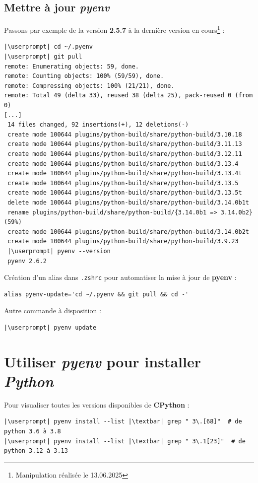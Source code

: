 \subsection*{Mettre à jour \textit{pyenv}}
Passons par exemple de la version \textbf{2.5.7} à la dernière version en cours\footnote{Manipulation réalisée le 13.06.2025} :
\begin{lstlisting}[style=bash]
|\userprompt| cd ~/.pyenv
|\userprompt| git pull
remote: Enumerating objects: 59, done.
remote: Counting objects: 100% (59/59), done.
remote: Compressing objects: 100% (21/21), done.
remote: Total 49 (delta 33), reused 38 (delta 25), pack-reused 0 (from 0)
[...]
 14 files changed, 92 insertions(+), 12 deletions(-)
 create mode 100644 plugins/python-build/share/python-build/3.10.18
 create mode 100644 plugins/python-build/share/python-build/3.11.13
 create mode 100644 plugins/python-build/share/python-build/3.12.11
 create mode 100644 plugins/python-build/share/python-build/3.13.4
 create mode 100644 plugins/python-build/share/python-build/3.13.4t
 create mode 100644 plugins/python-build/share/python-build/3.13.5
 create mode 100644 plugins/python-build/share/python-build/3.13.5t
 delete mode 100644 plugins/python-build/share/python-build/3.14.0b1t
 rename plugins/python-build/share/python-build/{3.14.0b1 => 3.14.0b2} (59%)
 create mode 100644 plugins/python-build/share/python-build/3.14.0b2t
 create mode 100644 plugins/python-build/share/python-build/3.9.23
 |\userprompt| pyenv --version
 pyenv 2.6.2
\end{lstlisting}

Création d'un alias dans \texttt{.zshrc} pour automatiser la mise à jour de \textbf{pyenv} :
\begin{lstlisting}[style=file]
alias pyenv-update='cd ~/.pyenv && git pull && cd -'
\end{lstlisting}

Autre commande à disposition :
\begin{lstlisting}[style=bash]
|\userprompt| pyenv update
\end{lstlisting}

\section{Utiliser \textit{pyenv} pour installer \textit{Python}}
Pour visualiser toutes les versions disponibles de \textbf{CPython} :
\begin{lstlisting}[style=bash]
|\userprompt| pyenv install --list |\textbar| grep " 3\.[68]"  # de python 3.6 à 3.8
|\userprompt| pyenv install --list |\textbar| grep " 3\.1[23]"  # de python 3.12 à 3.13
\end{lstlisting}

